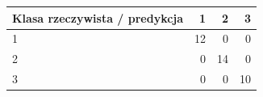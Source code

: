 \begin{tabular}{lrrr}
\hline
Klasa rzeczywista / predykcja & 1 & 2 & 3 \\
\hline
1 & 12 & 0 & 0 \\
2 & 0 & 14 & 0 \\
3 & 0 & 0 & 10 \\
\hline
\end{tabular}